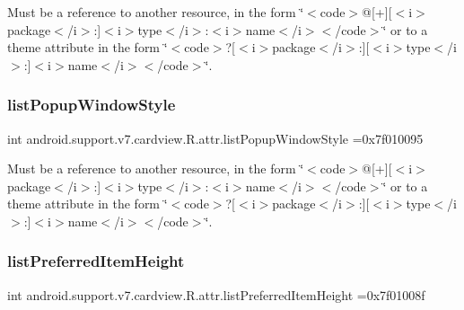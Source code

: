 Must be a reference to another resource, in the form \char`\"{}$<$code$>$@\mbox{[}+\mbox{]}\mbox{[}$<$i$>$package$<$/i$>$\+:\mbox{]}$<$i$>$type$<$/i$>$\+:$<$i$>$name$<$/i$>$$<$/code$>$\char`\"{} or to a theme attribute in the form \char`\"{}$<$code$>$?\mbox{[}$<$i$>$package$<$/i$>$\+:\mbox{]}\mbox{[}$<$i$>$type$<$/i$>$\+:\mbox{]}$<$i$>$name$<$/i$>$$<$/code$>$\char`\"{}. \mbox{\label{classandroid_1_1support_1_1v7_1_1cardview_1_1R_1_1attr_a1e3167b62207f7538133ab484f1b1f5d}} 
\subsubsection{\texorpdfstring{list\+Popup\+Window\+Style}{listPopupWindowStyle}}
{\footnotesize\ttfamily int android.\+support.\+v7.\+cardview.\+R.\+attr.\+list\+Popup\+Window\+Style =0x7f010095\hspace{0.3cm}{\ttfamily [static]}}

Must be a reference to another resource, in the form \char`\"{}$<$code$>$@\mbox{[}+\mbox{]}\mbox{[}$<$i$>$package$<$/i$>$\+:\mbox{]}$<$i$>$type$<$/i$>$\+:$<$i$>$name$<$/i$>$$<$/code$>$\char`\"{} or to a theme attribute in the form \char`\"{}$<$code$>$?\mbox{[}$<$i$>$package$<$/i$>$\+:\mbox{]}\mbox{[}$<$i$>$type$<$/i$>$\+:\mbox{]}$<$i$>$name$<$/i$>$$<$/code$>$\char`\"{}. \mbox{\label{classandroid_1_1support_1_1v7_1_1cardview_1_1R_1_1attr_a676d09478b28e34ac27954c7b6164b44}} 
\subsubsection{\texorpdfstring{list\+Preferred\+Item\+Height}{listPreferredItemHeight}}
{\footnotesize\ttfamily int android.\+support.\+v7.\+cardview.\+R.\+attr.\+list\+Preferred\+Item\+Height =0x7f01008f\hspace{0.3cm}{\ttfamily [static]}}

